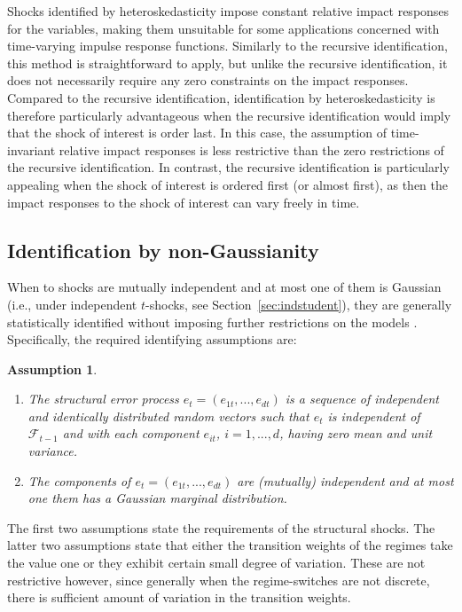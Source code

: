 \documentclass[nojss]{jss}
\newtheorem{assumption}{Assumption}
\begin{document}
Shocks identified by heteroskedasticity impose constant relative impact responses for the variables, making them unsuitable for some applications concerned with time-varying impulse response functions. Similarly to the recursive identification, this method is straightforward to apply, but unlike the recursive identification, it does not necessarily require any zero constraints on the impact responses. Compared to the recursive identification, identification by heteroskedasticity is therefore particularly advantageous when the recursive identification would imply that the shock of interest is order last. In this case, the assumption of time-invariant relative impact responses is less restrictive than the zero restrictions of the recursive identification. In contrast, the recursive identification is particularly appealing when the shock of interest is ordered first (or almost first), as then the impact responses to the shock of interest can vary freely in time.

\subsection{Identification by non-Gaussianity}
When to shocks are mutually independent and at most one of them is Gaussian (i.e., under independent $t$-shocks, see Section~\ref{sec:indstudent}), they are generally statistically identified without imposing further restrictions on the models \citep{Virolainen2:2024}. Specifically, the required identifying assumptions are:
\begin{assumption}\label{as:shocks}
\begin{enumerate}%
\item The structural error process $e_t=(e_{1t},...,e_{dt})$ is a sequence of independent and identically distributed random vectors such that $e_t$ is independent of $\mathcal{F}_{t-1}$ and with each component $e_{it}$, $i=1,...,d$, having zero mean and unit variance.
\item The components of $e_t=(e_{1t},...,e_{dt})$ are (mutually) independent and at most one them has a Gaussian marginal distribution.
\end{enumerate}
\end{assumption}
The first two assumptions state the requirements of the structural shocks. The latter two assumptions state that either the transition weights of the regimes take the value one or they exhibit certain small degree of variation. These are not restrictive however, since generally when the regime-switches are not discrete, there is sufficient amount of variation in the transition weights.
\end{document}
